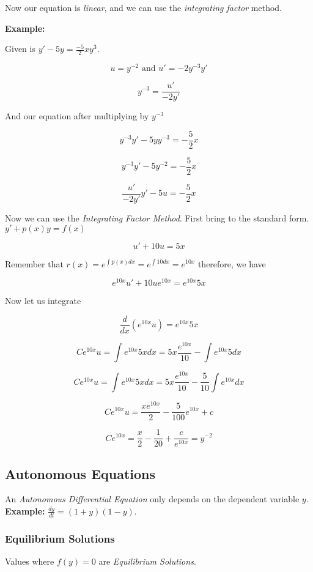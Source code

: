 Now our equation is \emph{linear}, and we can use the \emph{integrating factor} method.
\vspace{\baselineskip}

\textbf{Example: }
\vspace{\baselineskip}

Given is \(y' -5y = \frac{-5}{2}xy^3\).

\[
u = y^{-2}  \text{ and } u' = -2y^{-3}y'
\]

\[
y^{-3} = \frac{u'}{-2y'}
\]

And our equation after multiplying by \(y^{-3}\)

\[
 y^{-3}y' - 5yy^{-3} = -\frac{5}{2}x 
\]

\[
y^{-3}y' - 5y^{-2} = -\frac{5}{2}x 
\]

\[
\frac{u'}{-2y'}y' - 5u = -\frac{5}{2}x 
\]

Now we can use the \emph{Integrating Factor Method}. First bring to the standard form.
\(y' + p(x)y = f(x)\)

\[
  u' + 10u = 5x 
\]

Remember that \(r(x) = e^{\int p(x)dx} = e^{\int 10 dx} = e^{10x}\) therefore, we have

\[
e^{10x}u' + 10ue^{10x} = e^{10x}5x
\]

Now let us integrate

\[
\frac{d}{dx} \left(e^{10x}u\right) = e^{10x}5x
\]

\[
Ce^{10x}u = \int e^{10x} 5x dx = 5x \frac{e^{10x}}{10} - \int e^{10x}5dx
\]

\[
Ce^{10x}u = \int e^{10x} 5x dx = 5x \frac{e^{10x}}{10} - \frac{5}{10}\int e^{10x}dx
\]

\[
Ce^{10x}u = \frac{xe^{10x}}{2} - \frac{5}{100} e^{10x} + c
\]

\[
    Ce^{10x} = \frac{x}{2} - \frac{1}{20} + \frac{c}{e^{10x}} = y^{-2}
\]


\subsection{Autonomous Equations}

An \emph{Autonomous Differential Equation} only depends on the dependent
variable \(y\).\textbf{ Example: } \(\frac{dy}{dt} = (1 + y)(1 -y)\).

\subsubsection{Equilibrium Solutions}
Values where \(f(y) = 0\) are \emph{Equilibrium Solutions}.

